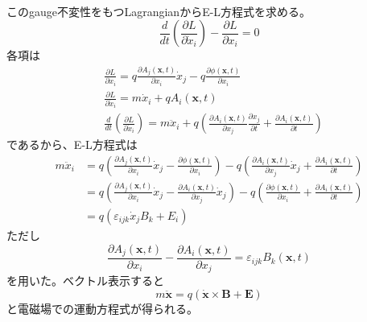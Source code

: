 \documentclass{jsarticle}
\begin{document}
\\
このgauge不変性をもつLagrangianからE-L方程式を求める。\\
\[\frac{d}{dt}\left(\frac{\partial L}{\partial\dot{x}_{i}}\right)-\frac{\partial L}{\partial x_{i}}=0\]
各項は
\begin{align*}
&\frac{\partial L}{\partial x_{i}}=q\frac{\partial A_{j}(\bm{x},t)}{\partial x_{i}}\dot{x}_{j}-q\frac{\partial\phi(\bm{x},t)}{\partial x_{i}}\\
&\frac{\partial L}{\partial\dot{x}_{i}}=m\dot{x}_{i}+qA_{i}(\bm{x},t)\\
&\frac{d}{dt}\left(\frac{\partial L}{\partial\dot{x}_{i}}\right)=m\ddot{x}_{i}+q\left(\frac{\partial A_{i}(\bm{x},t)}{\partial x_{j}}\frac{\partial x_{j}}{\partial t}+\frac{\partial A_{i}(\bm{x},t)}{\partial t}\right)
\end{align*}
であるから、E-L方程式は
\begin{align*}
m\ddot{x}_{i}&=q\left(\frac{\partial A_{j}(\bm{x},t)}{\partial x_{i}}\dot{x}_{j}-\frac{\partial\phi(\bm{x},t)}{\partial x_{i}}\right)-q\left(\frac{\partial A_{i}(\bm{x},t)}{\partial x_{j}}\dot{x}_{j}+\frac{\partial A_{i}(\bm{x},t)}{\partial t}\right)\\
&=q\left(\frac{\partial A_{j}(\bm{x},t)}{\partial x_{i}}\dot{x}_{j}-\frac{\partial A_{i}(\bm{x},t)}{\partial x_{j}}\dot{x}_{j}\right)-q\left(\frac{\partial\phi(\bm{x},t)}{\partial x_{i}}+\frac{\partial A_{i}(\bm{x},t)}{\partial t}\right)\\
&=q\left(\varepsilon_{ijk}\dot{x}_{j}B_{k}+E_{i}\right)
\end{align*}
ただし
\[\frac{\partial A_{j}(\bm{x},t)}{\partial x_{i}}-\frac{\partial A_{i}(\bm{x},t)}{\partial x_{j}}=\varepsilon_{ijk}B_{k}(\bm{x},t)\]
を用いた。ベクトル表示すると
\[m\ddot{\bm{x}}=q\left(\dot{\bm{x}}\times\bm{B}+\bm{E}\right)\]
と電磁場での運動方程式が得られる。
\end{document}
